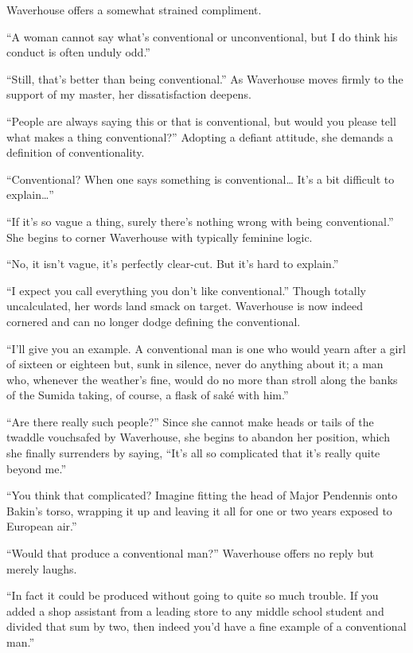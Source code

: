 \documentclass[12pt, openright]{book}
\begin{document}
Waverhouse offers a somewhat strained compliment.

``A woman cannot say what's conventional or unconventional, but I do
think his conduct is often unduly odd.''

``Still, that's better than being conventional.'' As Waverhouse moves
firmly to the support of my master, her dissatisfaction deepens.

``People are always saying this or that is conventional, but would you
please tell what makes a thing conventional?'' Adopting a defiant
attitude, she demands a definition of conventionality.

``Conventional? When one says something is conventional\ldots{} It's a
bit difficult to explain\ldots{}''

``If it's so vague a thing, surely there's nothing wrong with being
conventional.'' She begins to corner Waverhouse with typically feminine
logic.

``No, it isn't vague, it's perfectly clear-cut. But it's hard to
explain.''

``I expect you call everything you don't like conventional.'' Though
totally uncalculated, her words land smack on target. Waverhouse is now
indeed cornered and can no longer dodge defining the conventional.

``I'll give you an example. A conventional man is one who would yearn
after a girl of sixteen or eighteen but, sunk in silence, never do
anything about it; a man who, whenever the weather's fine, would do no
more than stroll along the banks of the Sumida taking, of course, a
flask of saké with him.''

``Are there really such people?'' Since she cannot make heads or tails
of the twaddle vouchsafed by Waverhouse, she begins to abandon her
position, which she finally surrenders by saying, ``It's all so
complicated that it's really quite beyond me.''

``You think that complicated? Imagine fitting the head of Major
Pendennis onto Bakin's torso, wrapping it up and leaving it all for one
or two years exposed to European air.''

``Would that produce a conventional man?'' Waverhouse offers no reply
but merely laughs.

``In fact it could be produced without going to quite so much trouble.
If you added a shop assistant from a leading store to any middle school
student and divided that sum by two, then indeed you'd have a fine
example of a conventional man.''
\end{document}
